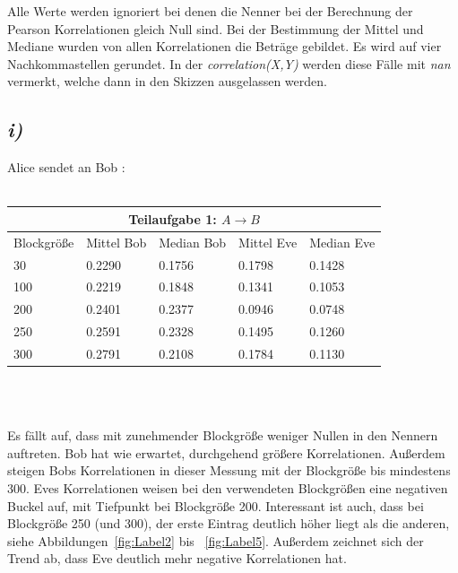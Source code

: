 \documentclass[12pt,a4paper]{article}
\begin{document}
Alle Werte werden ignoriert bei denen die Nenner bei der 
Berechnung der Pearson Korrelationen gleich Null sind. 
Bei der Bestimmung der Mittel und Mediane wurden von allen 
Korrelationen die Beträge gebildet. Es wird auf vier 
Nachkommastellen gerundet. In der \textit{correlation(X,Y)}
werden diese Fälle mit \textit{nan} vermerkt, welche dann 
in den Skizzen ausgelassen werden.


\subsection*{\textit{i)}}


Alice sendet an Bob :\\~\\


\Large
\begin{tabular}{ |p{3cm}|||p{3cm}|p{3cm}||p{3cm}|p{3cm}|}
    \hline
    \multicolumn{5}{|c|}{Teilaufgabe 1: $A\rightarrow B$} \\
    \hline
    Blockgröße & Mittel Bob & Median Bob & Mittel Eve & Median Eve\\
    \hline
    \hspace{3.2mm}30 & 0.2290 & 0.1756 & 0.1798 & 0.1428\\
    100 & 0.2219 & 0.1848 & 0.1341 & 0.1053\\
    200 & 0.2401 & 0.2377 & 0.0946 & 0.0748\\
    250 & 0.2591 & 0.2328 & 0.1495 & 0.1260\\
    300 & 0.2791 & 0.2108 & 0.1784 & 0.1130\\
    \hline
\end{tabular}
\\[0.7cm]\\
\normalsize

Es fällt auf, dass mit zunehmender Blockgröße weniger Nullen in den 
Nennern auftreten. Bob hat wie erwartet, durchgehend größere 
Korrelationen. Außerdem steigen Bobs Korrelationen in dieser Messung 
mit der Blockgröße bis mindestens 300. Eves Korrelationen weisen
bei den verwendeten Blockgrößen eine negativen Buckel auf, mit 
Tiefpunkt bei Blockgröße 200. Interessant ist auch, dass bei 
Blockgröße 250 (und 300), der erste Eintrag deutlich höher liegt 
als die anderen, siehe Abbildungen~\ref{fig:Label2} bis 
~\ref{fig:Label5}. Außerdem zeichnet sich 
der Trend ab, dass Eve deutlich mehr negative Korrelationen hat.
\end{document}
